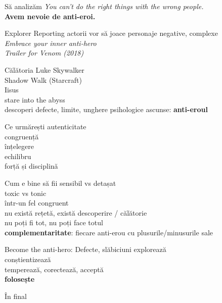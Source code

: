 \documentclass{simple}
\begin{document}
\begin{frame}{Să analizăm}
  \centering
  \Large
  \textit{You can't do the right things with the wrong people.} \\
  \vspace{1cm}
  \pause \textbf{Avem nevoie de anti-eroi.}
\end{frame}

\begin{frame}{Explorer Reporting}
  \centering
  \Large
  \pause actorii vor să joace personaje negative, complexe \\
  \vspace{1cm}
  \pause \textit{Embrace your inner anti-hero} \\
  \vspace{3mm}
  \hfill \textit{Trailer for Venom (2018)}
\end{frame}

\begin{frame}{Călătoria}
  \centering
  \Large
  \pause Luke Skywalker \\
  \pause Shadow Walk (Starcraft) \\
  \pause Iisus \\
  \pause stare into the abyss \\
  \pause descoperi defecte, limite, unghere psihologice ascunse: \textbf{anti-eroul}
\end{frame}

\begin{frame}{Ce urmărești}
  \centering
  \Large
  \pause autenticitate \\
  \pause congruență \\
  \pause înțelegere \\
  \pause echilibru \\
  \pause forță și disciplină
\end{frame}

\begin{frame}{Cum e bine să fii}
  \centering
  \Large
  \pause sensibil vs detașat \\
  \pause toxic vs tonic \\
  \pause într-un fel congruent \\
  \pause nu există rețetă, există descoperire / călătorie \\
  \pause nu poți fi tot, nu poți face totul \\
  \pause \textbf{complementaritate}: fiecare anti-erou cu plusurile/minusurile sale
\end{frame}

\begin{frame}{Become the anti-hero: Defecte, slăbiciuni}
  \centering
  \Large
  \pause explorează \\
  \pause conștientizează \\
  \pause temperează, corectează, acceptă \\
  \pause \textbf{folosește}
\end{frame}

\begin{frame}{În final}
  \centering
  \LARGE
\end{frame}
\end{document}
